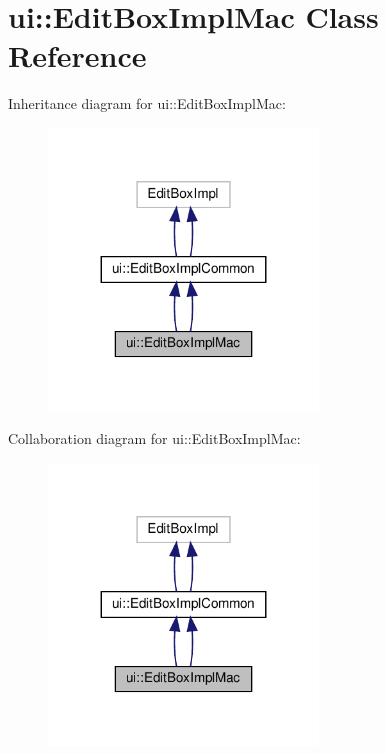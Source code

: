 \hypertarget{classui_1_1EditBoxImplMac}{}\section{ui\+:\+:Edit\+Box\+Impl\+Mac Class Reference}
\label{classui_1_1EditBoxImplMac}


Inheritance diagram for ui\+:\+:Edit\+Box\+Impl\+Mac\+:
\nopagebreak
\begin{figure}[H]
\begin{center}
\leavevmode
\includegraphics[width=203pt]{classui_1_1EditBoxImplMac__inherit__graph}
\end{center}
\end{figure}


Collaboration diagram for ui\+:\+:Edit\+Box\+Impl\+Mac\+:
\nopagebreak
\begin{figure}[H]
\begin{center}
\leavevmode
\includegraphics[width=203pt]{classui_1_1EditBoxImplMac__coll__graph}
\end{center}
\end{figure}
